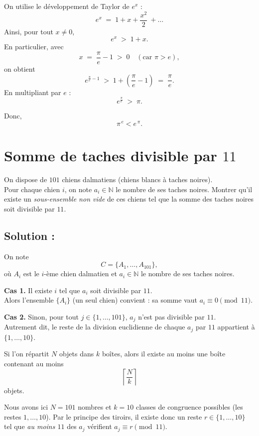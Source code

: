 On utilise le développement de Taylor de $e^x$ :
\[
e^x \;=\; 1 + x + \frac{x^2}{2}\ +  \dots 
\]
Ainsi, pour tout $x\ne 0$,
\[
e^x \;>\; 1 + x.
\]
En particulier, avec 
\[
x \;=\; \frac{\pi}{e} - 1 \;>\; 0 \quad (\text{car } \pi>e),
\]
on obtient
\[
e^{\frac{\pi}{e}-1} \;>\; 1 + \left(\frac{\pi}{e}-1\right) \;=\; \frac{\pi}{e}.
\]
En multipliant par $e$ :
\[
e^{\frac{\pi}{e}} \;>\; \pi.
\]

Donc, 
\[
\boxed{\pi^{\,e} < e^{\,\pi}}.
\]

\section{Somme de taches divisible par $11$}

\begin{exerciseBox}
On dispose de $101$ chiens dalmatiens (chiens blancs à taches noires).\\ 
Pour chaque chien $i$, on note $a_i \in \mathbb{N}$ le nombre de ses taches noires.
Montrer qu'il existe un \emph{sous-ensemble non vide} de ces chiens tel que la somme des taches noires soit divisible par $11$.
\end{exerciseBox}

\subsection*{Solution :}


On note
\[
C=\{A_1,\dots,A_{101}\},
\]
où $A_i$ est le $i$-ème chien dalmatien et $a_i\in\mathbb{N}$ le nombre de ses taches noires.

\medskip
\textbf{Cas 1.} Il existe $i$ tel que $a_i$ soit divisible par $11$. \\
Alors l’ensemble $\{A_i\}$ (un seul chien) convient : sa somme vaut $a_i\equiv 0 \pmod{11}$.

\medskip
\textbf{Cas 2.} Sinon, pour tout $j\in\{1,\dots,101\}$, $a_j$ n’est pas divisible par $11$. \\
Autrement dit, le reste de la division euclidienne de chaque $a_j$ par $11$ appartient à $\{1,\dots,10\}$.

\begin{rappelBox}
Si l’on répartit $N$ objets dans $k$ boîtes, alors il existe au moins une boîte contenant au moins
\[
\left\lceil \frac{N}{k} \right\rceil
\]
objets.
\end{rappelBox}

Nous avons ici $N=101$ nombres et $k=10$ classes de congruence possibles (les restes $1,\dots,10$). Par le principe des tiroirs, il existe donc un reste $r\in\{1,\dots,10\}$ tel que \emph{au moins $11$} des $a_j$ vérifient $a_j\equiv r \pmod{11}$.

